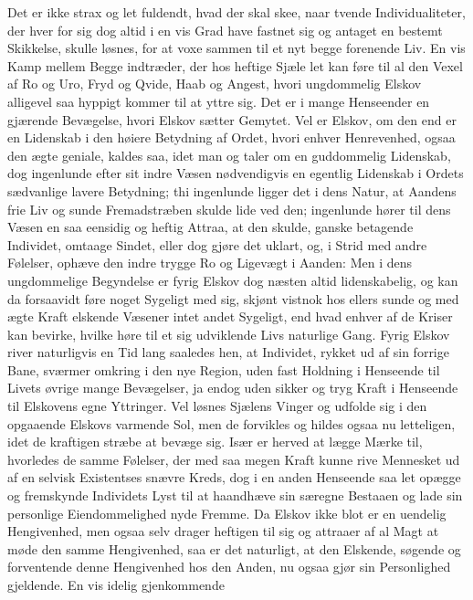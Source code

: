 \documentclass[12pt,a4paper]{book}
\newcommand{\apage}[1]{\marginnote{\footnotesize\textit{[#1]}}}
\begin{document}
Det er ikke strax og let fuldendt, hvad der skal skee, naar tvende
Individualiteter, der hver for sig dog altid i en vis Grad have fastnet
sig og antaget en \apage{113} bestemt Skikkelse, skulle løsnes, for at voxe sammen
til et nyt begge forenende Liv. En vis Kamp mellem Begge indtræder, der
hos heftige Sjæle let kan føre til al den Vexel af Ro og Uro, Fryd og
Qvide, Haab og Angest, hvori ungdommelig Elskov alligevel saa hyppigt
kommer til at yttre sig. Det er i mange Henseender en gjærende Bevægelse,
hvori Elskov sætter Gemytet. Vel er Elskov, om den end er en Lidenskab i
den høiere Betydning af Ordet, hvori enhver Henrevenhed, ogsaa den ægte
geniale, kaldes saa, idet man og taler om en guddommelig Lidenskab, dog
ingenlunde efter sit indre Væsen nødvendigvis en egentlig Lidenskab i
Ordets sædvanlige lavere Betydning; thi ingenlunde ligger det i dens
Natur, at Aandens frie Liv og sunde Fremadstræben skulde lide ved den;
ingenlunde hører til dens Væsen en saa eensidig og heftig Attraa, at den
skulde, ganske betagende Individet, omtaage Sindet, eller dog gjøre det
uklart, og, i Strid med andre Følelser, ophæve den indre trygge Ro og
Ligevægt i Aanden: Men i dens ungdommelige Begyndelse er fyrig Elskov
dog næsten altid lidenskabelig, og kan da forsaavidt føre noget Sygeligt
med sig, skjønt vistnok hos ellers sunde og med ægte Kraft elskende
Væsener intet andet Sygeligt, end hvad enhver af de Kriser kan bevirke,
hvilke høre til et sig udviklende Livs naturlige Gang. Fyrig Elskov
river naturligvis en Tid lang saaledes hen, at Individet, rykket ud af
sin forrige Bane, sværmer omkring i den nye Region, uden \apage{114} fast Holdning i
Henseende til Livets øvrige mange Bevægelser, ja endog uden sikker og
tryg Kraft i Henseende til Elskovens egne Yttringer. Vel løsnes Sjælens
Vinger og udfolde sig i den opgaaende Elskovs varmende Sol, men de
forvikles og hildes ogsaa nu letteligen, idet de kraftigen stræbe at
bevæge sig. Især er herved at lægge Mærke til, hvorledes de samme
Følelser, der med saa megen Kraft kunne rive Mennesket ud af en selvisk
Existentses snævre Kreds, dog i en anden Henseende saa let opægge og
fremskynde Individets Lyst til at haandhæve sin særegne Bestaaen og lade
sin personlige Eiendommelighed nyde Fremme. Da Elskov ikke blot er en
uendelig Hengivenhed, men ogsaa selv drager heftigen til sig og attraaer
af al Magt at møde den samme Hengivenhed, saa er det naturligt, at den
Elskende, søgende og forventende denne Hengivenhed hos den Anden, nu
ogsaa gjør sin Personlighed gjeldende. En vis idelig gjenkommende
\end{document}

